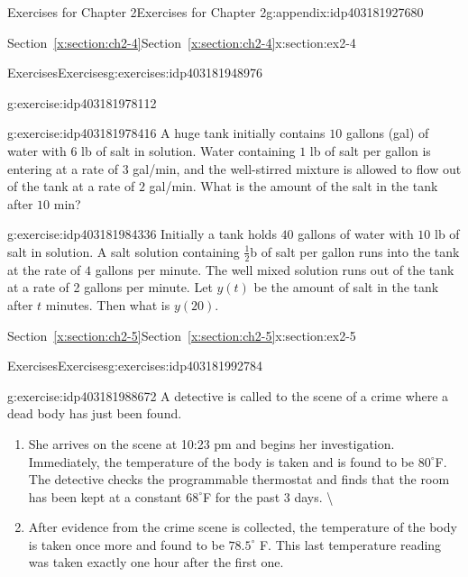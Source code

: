 \documentclass[oneside,10pt,]{book}
\newcommand{\xreffont}{\relax}
\numberwithin{equation}{section}
\numberwithin{equation}{section}
\begin{document}
\begin{appendixptx}{Exercises for Chapter 2}{}{Exercises for Chapter 2}{}{}{g:appendix:idp403181927680}
\begin{sectionptx}{Section~{\xreffont\ref*{x:section:ch2-4}}}{}{Section~{\xreffont\ref*{x:section:ch2-4}}}{}{}{x:section:ex2-4}
\begin{exercises-subsection-numberless}{Exercises}{}{Exercises}{}{}{g:exercises:idp403181948976}
\begin{divisionexercise}{5}{}{}{g:exercise:idp403181978112}
\end{divisionexercise}%
\begin{divisionexercise}{6}{}{}{g:exercise:idp403181978416}%
A huge tank initially contains \(10\) gallons (gal) of water with \(6\) lb of salt in solution. Water containing \(1\) lb of salt per gallon is entering at a rate of \(3\) gal\slash{}min, and the well-stirred mixture is allowed to flow out of the tank at a rate of \(2\) gal\slash{}min. What is the amount of the salt in the tank after \(10\) min?%
\end{divisionexercise}%
\begin{divisionexercise}{7}{}{}{g:exercise:idp403181984336}%
Initially a tank holds \(40\) gallons of water with \(10\) lb of salt in solution. A salt solution containing \(\frac{1}{2}\)b of salt per gallon runs into the tank at the rate of \(4\) gallons per minute. The well mixed solution runs out of the tank at a rate of 2 gallons per minute. Let \(y(t)\) be the amount of salt in the tank after \(t\) minutes. Then what is \(y(20)\).%
\end{divisionexercise}%
\end{exercises-subsection-numberless}
\end{sectionptx}
%
%
\typeout{************************************************}
\typeout{Section C.5 Section~{\xreffont\ref*{x:section:ch2-5}}}
\typeout{************************************************}
%
\begin{sectionptx}{Section~{\xreffont\ref*{x:section:ch2-5}}}{}{Section~{\xreffont\ref*{x:section:ch2-5}}}{}{}{x:section:ex2-5}
%
%
\typeout{************************************************}
\typeout{************************************************}
%
\begin{exercises-subsection-numberless}{Exercises}{}{Exercises}{}{}{g:exercises:idp403181992784}
\begin{divisionexercise}{1}{}{}{g:exercise:idp403181988672}%
A detective is called to the scene of a crime where a dead body has just been found.%
\begin{enumerate}[label=(\alph*)]
\item{}She arrives on the scene at 10:23 pm and begins her investigation. Immediately, the temperature of the body is taken and is found to be \(80^{\circ}\)F. The detective checks the programmable thermostat and finds that the room has been kept at a constant \(68^{\circ}\)F for the past 3 days.%
 \textbackslash{}\item{}After evidence from the crime scene is collected, the temperature of the body is taken once more and found to be \(78.5^{\circ}\) F. This last temperature reading was taken exactly one hour after the first one.%

\end{enumerate}
\end{divisionexercise}
\end{exercises-subsection-numberless}
\end{sectionptx}
\end{appendixptx}
\end{document}
